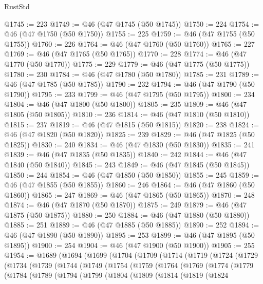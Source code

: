 \begin{lexlean}{RustStd}
\begin{coremodule}
{\begin{coremodule}
{{{{{{{{{{{{{{@1745 := 223
@1749 := @46 (@47 @1745 (@50 @1745))
@1750 := 224
@1754 := @46 (@47 @1750 (@50 @1750))
@1755 := 225
@1759 := @46 (@47 @1755 (@50 @1755))
@1760 := 226
@1764 := @46 (@47 @1760 (@50 @1760))
@1765 := 227
@1769 := @46 (@47 @1765 (@50 @1765))
@1770 := 228
@1774 := @46 (@47 @1770 (@50 @1770))
@1775 := 229
@1779 := @46 (@47 @1775 (@50 @1775))
@1780 := 230
@1784 := @46 (@47 @1780 (@50 @1780))
@1785 := 231
@1789 := @46 (@47 @1785 (@50 @1785))
@1790 := 232
@1794 := @46 (@47 @1790 (@50 @1790))
@1795 := 233
@1799 := @46 (@47 @1795 (@50 @1795))
@1800 := 234
@1804 := @46 (@47 @1800 (@50 @1800))
@1805 := 235
@1809 := @46 (@47 @1805 (@50 @1805))
@1810 := 236
@1814 := @46 (@47 @1810 (@50 @1810))
@1815 := 237
@1819 := @46 (@47 @1815 (@50 @1815))
@1820 := 238
@1824 := @46 (@47 @1820 (@50 @1820))
@1825 := 239
@1829 := @46 (@47 @1825 (@50 @1825))
@1830 := 240
@1834 := @46 (@47 @1830 (@50 @1830))
@1835 := 241
@1839 := @46 (@47 @1835 (@50 @1835))
@1840 := 242
@1844 := @46 (@47 @1840 (@50 @1840))
@1845 := 243
@1849 := @46 (@47 @1845 (@50 @1845))
@1850 := 244
@1854 := @46 (@47 @1850 (@50 @1850))
@1855 := 245
@1859 := @46 (@47 @1855 (@50 @1855))
@1860 := 246
@1864 := @46 (@47 @1860 (@50 @1860))
@1865 := 247
@1869 := @46 (@47 @1865 (@50 @1865))
@1870 := 248
@1874 := @46 (@47 @1870 (@50 @1870))
@1875 := 249
@1879 := @46 (@47 @1875 (@50 @1875))
@1880 := 250
@1884 := @46 (@47 @1880 (@50 @1880))
@1885 := 251
@1889 := @46 (@47 @1885 (@50 @1885))
@1890 := 252
@1894 := @46 (@47 @1890 (@50 @1890))
@1895 := 253
@1899 := @46 (@47 @1895 (@50 @1895))
@1900 := 254
@1904 := @46 (@47 @1900 (@50 @1900))
@1905 := 255
@1954 := @1689
    (@1694
      (@1699
        (@1704
          (@1709
            (@1714
              (@1719
                (@1724
                  (@1729
                    (@1734
                      (@1739
                        (@1744
                          (@1749
                            (@1754
                              (@1759
                                (@1764
                                  (@1769
                                    (@1774
                                      (@1779
                                        (@1784
                                          (@1789
                                            (@1794
                                              (@1799
                                                (@1804
                                                  (@1809
                                                    (@1814
                                                      (@1819
                                                        (@1824
}}}}}}}}}}}}}}
\end{coremodule}}
\end{coremodule}
\end{lexlean}

